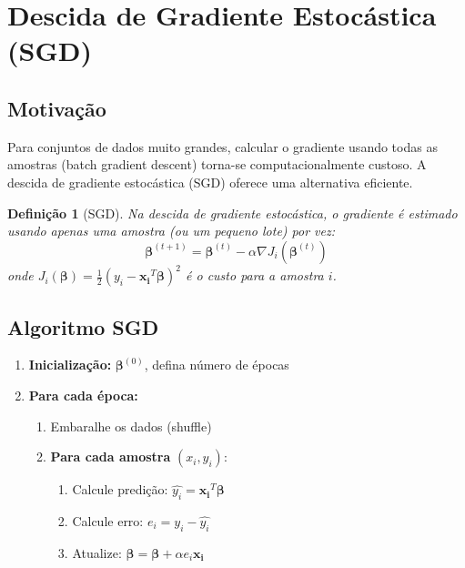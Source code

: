 \documentclass[a4paper,12pt]{article}
\newtheorem{definicao}{Definição}[section]
\begin{document}
\section{Descida de Gradiente Estocástica (SGD)}

\subsection{Motivação}

Para conjuntos de dados muito grandes, calcular o gradiente usando todas as amostras (batch gradient descent) torna-se computacionalmente custoso. A descida de gradiente estocástica (SGD) oferece uma alternativa eficiente.

\begin{definicao}[SGD]
Na descida de gradiente estocástica, o gradiente é estimado usando apenas uma amostra (ou um pequeno lote) por vez:
\begin{equation}
    \boldsymbol{\beta}^{(t+1)} = \boldsymbol{\beta}^{(t)} - \alpha \nabla J_i(\boldsymbol{\beta}^{(t)})
\end{equation}
onde $J_i(\boldsymbol{\beta}) = \frac{1}{2}(y_i - \mathbf{x_i}^T\boldsymbol{\beta})^2$ é o custo para a amostra $i$.
\end{definicao}

\subsection{Algoritmo SGD}

\begin{enumerate}
    \item \textbf{Inicialização:} $\boldsymbol{\beta}^{(0)}$, defina número de épocas
    \item \textbf{Para cada época:}
    \begin{enumerate}
        \item Embaralhe os dados (shuffle)
        \item \textbf{Para cada amostra} $(x_i, y_i)$:
        \begin{enumerate}
            \item Calcule predição: $\hat{y_i} = \mathbf{x_i}^T\boldsymbol{\beta}$
            \item Calcule erro: $e_i = y_i - \hat{y_i}$
            \item Atualize: $\boldsymbol{\beta} = \boldsymbol{\beta} + \alpha e_i \mathbf{x_i}$
        \end{enumerate}
    \end{enumerate}
\end{enumerate}
\end{document}
